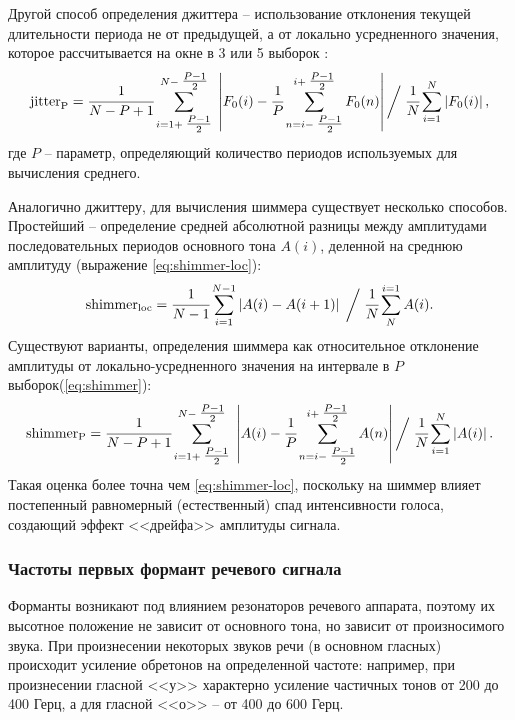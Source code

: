 Другой способ определения джиттера -- использование отклонения текущей длительности периода не от предыдущей, а от локально усредненного значения, которое рассчитывается на окне в 3 или 5 выборок \cite{farrus2007jitter}:
\begin{equation}\label{eq:jitter}
	\mathrm{jitter}_{\mathrm{P}} = \cfrac{1}{N - P + 1}\sum_{i = 1 + \textstyle\frac{P - 1}{2}}^{N - \textstyle\frac{P - 1}{2}}\;\left|F_0(i) - \cfrac{1}{P}\sum^{i + \textstyle\frac{P - 1}{2}}_{n = i - \textstyle\frac{P - 1}{2}}F_0(n)\right|\bigg/\;\cfrac{1}{N}\sum_{i = 1}^{N}\left|F_0(i)\right|,
\end{equation}
где $P$ -- параметр, определяющий количество периодов используемых для вычисления среднего.


Аналогично джиттеру, для вычисления шиммера существует несколько способов. Простейший -- определение средней абсолютной разницы между амплитудами последовательных периодов основного тона $A(i)$, деленной на среднюю амплитуду (выражение \ref{eq:shimmer-loc}):
\begin{equation}\label{eq:shimmer-loc}
	\mathrm{shimmer}_{\mathrm{loc}} = \cfrac{1}{N - 1}\sum_{i = 1}^{N - 1}\left|A(i) - A(i + 1)\right|\;\bigg/\;
	\cfrac{1}{N}\sum_{N}^{i = 1}A(i).
\end{equation}
Существуют варианты, определения шиммера как относительное отклонение амплитуды от локально-усредненного значения на интервале в $P$ выборок(\ref{eq:shimmer}):
\begin{equation}\label{eq:shimmer}
	\mathrm{shimmer}_{\mathrm{P}} = \cfrac{1}{N - P + 1}\sum_{i = 1 + \textstyle\frac{P - 1}{2}}^{N - \textstyle\frac{P - 1}{2}}\;\left|A(i) - \cfrac{1}{P}\sum^{i + \textstyle\frac{P - 1}{2}}_{n = i - \textstyle\frac{P - 1}{2}}A(n)\right|\bigg/\;\cfrac{1}{N}\sum_{i = 1}^{N}\left|A(i)\right|.
\end{equation}
Такая оценка более точна чем \ref{eq:shimmer-loc}, поскольку на шиммер влияет постепенный равномерный (естественный) спад интенсивности голоса, создающий эффект <<дрейфа>> амплитуды сигнала.~\cite{baken2000clinical} 
\subsubsection{Частоты первых формант речевого сигнала}
Форманты возникают под влиянием резонаторов речевого аппарата, поэтому их высотное положение не зависит от основного тона, но зависит от произносимого звука. При произнесении некоторых звуков речи (в основном гласных) происходит усиление обретонов на определенной частоте: например, при произнесении гласной <<у>> характерно усиление частичных тонов от 200 до 400 Герц, а для гласной <<о>> -- от 400 до 600 Герц.

